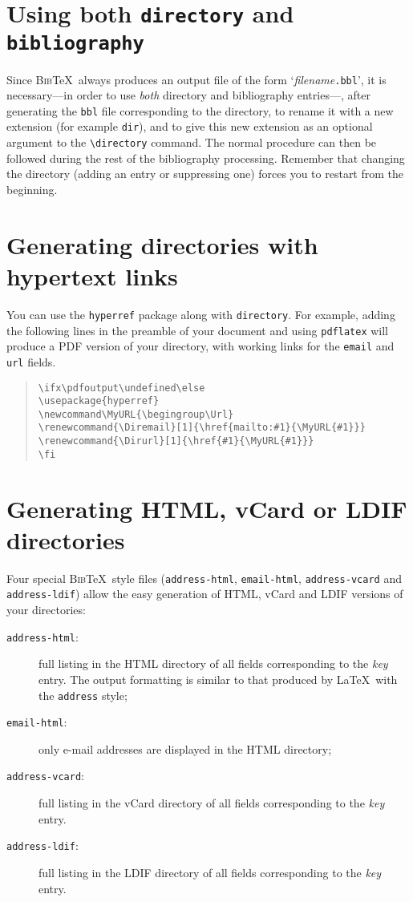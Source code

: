 \documentclass[10pt]{article}
\newcommand\MyURL{\begingroup\Url}
\renewcommand{\Diremail}[1]{\href{mailto:#1}{\MyURL{#1}}}
\renewcommand{\Dirurl}[1]{\href{#1}{\MyURL{#1}}}
\newcommand{\BibTeX}{\textsc{Bib}\TeX}
\newcommand{\Quote}[1]{`{#1}'}
\begin{document}
\section{Using both \texttt{directory} and \texttt{bibliography}}
\label{sec:usingboth}

Since \BibTeX\ always produces an output file of the form
\Quote{\emph{filename}\texttt{.bbl}}, it is necessary---in order to use \emph{both}
directory and bibliography entries---, after generating the \texttt{bbl} file
corresponding to the directory, to rename it with a new extension (for example
\texttt{dir}), and to give this new extension as an optional argument to the
\verb'\directory' command. The normal procedure can then be followed during the
rest of the bibliography processing. Remember that changing the directory
(adding an entry or suppressing one) forces you to restart from the beginning.

\section{Generating directories with hypertext links}

You can use the \texttt{hyperref} package along with \texttt{directory}. For
example, adding the following lines in the preamble of your document and
using \texttt{pdflatex} will produce a PDF version of your directory, with
working links for the \verb'email' and \verb'url' fields.

\begin{quote}
\begin{verbatim}
\ifx\pdfoutput\undefined\else
\usepackage{hyperref}
\newcommand\MyURL{\begingroup\Url}
\renewcommand{\Diremail}[1]{\href{mailto:#1}{\MyURL{#1}}}
\renewcommand{\Dirurl}[1]{\href{#1}{\MyURL{#1}}}
\fi
\end{verbatim}
\end{quote}

\section{Generating HTML, vCard or LDIF directories}

Four special \BibTeX\ style files (\texttt{address-html},
\texttt{email-html}, \texttt{address-vcard} and \texttt{address-ldif}) allow
the easy generation of HTML, vCard and LDIF versions of your directories:

\begin{description}
\item[\textmd{\texttt{address-html}:}]
full listing in the HTML directory of all fields corresponding to the
\emph{key} entry. The output formatting is similar to that produced by \LaTeX\
with the \texttt{address} style;
\item[\textmd{\texttt{email-html}:}]
only e-mail addresses are displayed in the HTML directory;
\item[\textmd{\texttt{address-vcard}:}]
full listing in the vCard directory of all fields corresponding to the
\emph{key} entry.
\item[\textmd{\texttt{address-ldif}:}]
full listing in the LDIF directory of all fields corresponding to the
\emph{key} entry.
\end{description}
\end{document}
